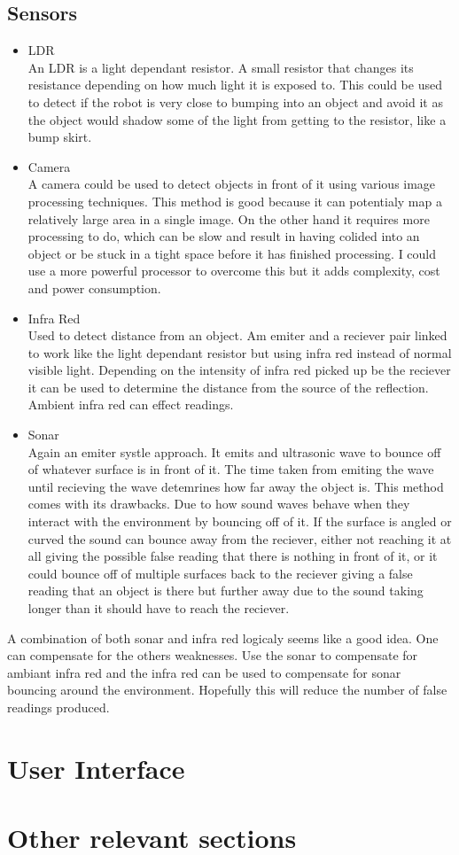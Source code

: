 \subsection{Sensors}

\begin{itemize}
\item LDR
\\An LDR is a light dependant resistor.  A small resistor that changes its resistance depending on how much light it is exposed to.  This could be used to detect if the robot is very close to bumping into an object and avoid it as the object would shadow some of the light from getting to the resistor, like a bump skirt.

\item Camera
\\A camera could be used to detect objects in front of it using various image processing techniques.  This method is good because it can potentialy map a relatively large area in a single image.  On the other hand it requires more processing to do, which can be slow and result in having colided into an object or be stuck in a tight space before it has finished processing.  I could use a more powerful processor to overcome this but it adds complexity, cost and power consumption.

\item Infra Red
\\Used to detect distance from an object.  Am emiter and a reciever pair linked to work like the light dependant resistor but using infra red instead of normal visible light.  Depending on the intensity of infra red picked up be the reciever it can be used to determine the distance from the source of the reflection.  Ambient infra red can effect readings.

\item Sonar
\\Again an emiter systle approach.  It emits and ultrasonic wave to bounce off of whatever surface is in front of it.  The time taken from emiting the wave until recieving the wave detemrines how far away the object is.  This method comes with its drawbacks.  Due to how sound waves behave when they interact with the environment by bouncing off of it.  If the surface is angled or curved the sound can bounce away from the reciever, either not reaching it at all giving the possible false reading that there is nothing in front of it, or it could bounce off of multiple surfaces back to the reciever giving a false reading that an object is there but further away due to the sound taking longer than it should have to reach the reciever.

\end{itemize}
A combination of both sonar and infra red logicaly seems like a good idea.  One can compensate for the others weaknesses.  Use the sonar to compensate for ambiant infra red and the infra red can be used to compensate for sonar bouncing around the environment.  Hopefully this will reduce the number of false readings produced.
\section{User Interface}

\section{Other relevant sections}
